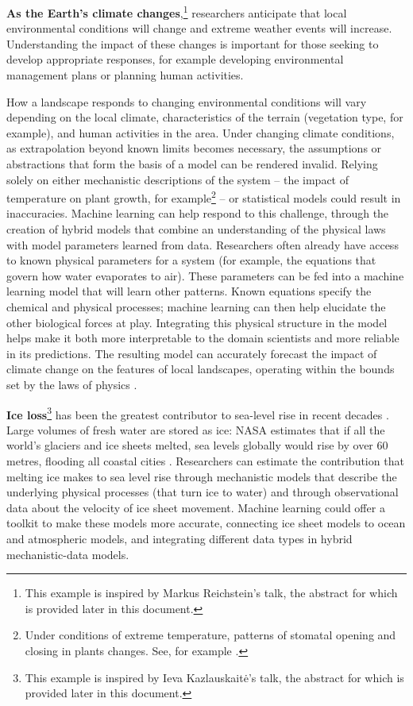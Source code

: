 \textbf{As the Earth's climate changes},\footnote{This example is
  inspired by Markus Reichstein's talk, the abstract for which is
  provided later in this document.} researchers anticipate that local
environmental conditions will change and extreme weather events will
increase. Understanding the impact of these changes is important for
those seeking to develop appropriate responses, for example developing
environmental management plans or planning human activities.

How a landscape responds to changing environmental conditions will vary
depending on the local climate, characteristics of the terrain
(vegetation type, for example), and human activities in the area. Under
changing climate conditions, as extrapolation beyond known limits
becomes necessary, the assumptions or abstractions that form the basis
of a model can be rendered invalid. Relying solely on either mechanistic
descriptions of the system -- the impact of temperature on plant growth,
for example\footnote{Under conditions of extreme temperature, patterns
  of stomatal opening and closing in plants changes. See, for example \cite{Marchin-extreme22}.} -- or statistical models could
result in inaccuracies. Machine learning can help respond to this
challenge, through the creation of hybrid models that combine an
understanding of the physical laws with model parameters learned from
data. Researchers often already have access to known physical parameters
for a system (for example, the equations that govern how water
evaporates to air). These parameters can be fed into a machine learning
model that will learn other patterns. Known equations specify the
chemical and physical processes; machine learning can then help
elucidate the other biological forces at play. Integrating this physical
structure in the model helps make it both more interpretable to the
domain scientists and more reliable in its predictions. The resulting
model can accurately forecast the impact of climate change on the
features of local landscapes, operating within the bounds set by the
laws of physics \citep{}.

\textbf{Ice loss}\footnote{This example is inspired by Ieva
Kazlauskaitė's talk, the abstract for which is provided later in this
document.} has been the greatest contributor to sea-level rise in
recent decades \citep{Portner-ipcc19}. Large volumes of fresh water
are stored as ice: NASA estimates that if all the world's glaciers and
ice sheets melted, sea levels globally would rise by over 60 metres,
flooding all coastal cities \citep{NASA-understanding}. Researchers
can estimate the contribution that melting ice makes to sea level rise
through mechanistic models that describe the underlying physical
processes (that turn ice to water) and through observational data
about the velocity of ice sheet movement. Machine learning could offer
a toolkit to make these models more accurate, connecting ice sheet
models to ocean and atmospheric models, and integrating different data
types in hybrid mechanistic-data models.


